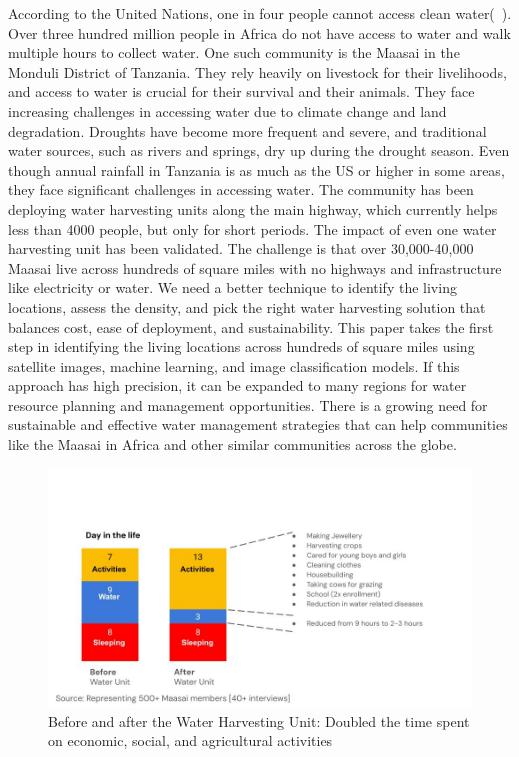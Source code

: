 \documentclass[10pt]{article}
\begin{document}
According to the United Nations, one in four people cannot access clean water(~\autocite{United_Nations}). Over three hundred million people in Africa do not have access to water and walk multiple hours to collect water. One such community is the Maasai in the Monduli District of Tanzania. They rely heavily on livestock for their livelihoods, and access to water is crucial for their survival and their animals. They face increasing challenges in accessing water due to climate change and land degradation. Droughts have become more frequent and severe, and traditional water sources, such as rivers and springs, dry up during the drought season. Even though annual rainfall in Tanzania is as much as the US or higher in some areas, they face significant challenges in accessing water. The community has been deploying water harvesting units along the main highway, which currently helps less than 4000 people, but only for short periods. The impact of even one water harvesting unit has been validated. The challenge is that over 30,000-40,000 Maasai live across hundreds of square miles with no highways and infrastructure like electricity or water. We need a better technique to identify the living locations, assess the density, and pick the right water harvesting solution that balances cost, ease of deployment, and sustainability. This paper takes the first step in identifying the living locations across hundreds of square miles using satellite images, machine learning, and image classification models. If this approach has high precision, it can be expanded to many regions for water resource planning and management opportunities.  There is a growing need for sustainable and effective water management strategies that can help communities like the Maasai in Africa and other similar communities across the globe.

\begin{figure} [H]
    \centering
    \includegraphics[width=1\linewidth]{images/beforeandafterwhu.jpg}
    \caption{Before and after the Water Harvesting Unit: Doubled the time spent on economic, social, and agricultural activities}
    \label{fig:bef_aft_results}
\end{figure}
\end{document}

